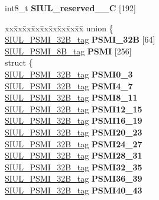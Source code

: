 \begin{DoxyCompactItemize}
\begin{tabbing}
\end{tabbing}\item 
\mbox{\label{structSIU__tag_a04fb21fe51eae5f1130c5e9516271325}} 
int8\+\_\+t {\bfseries S\+I\+U\+L\+\_\+reserved\+\_\+\_\+C} \mbox{[}192\mbox{]}
\item 
\mbox{\label{structSIU__tag_a2c80f10c0d6897747f3bd363f3743f54}} 
\begin{tabbing}
xx\=xx\=xx\=xx\=xx\=xx\=xx\=xx\=xx\=\kill
union \{\\
\>\mbox{\hyperlink{unionSIUL__PSMI__32B__tag}{SIUL\_PSMI\_32B\_tag}} {\bfseries PSMI\_32B} \mbox{[}64\mbox{]}\\
\>\mbox{\hyperlink{unionSIUL__PSMI__8B__tag}{SIUL\_PSMI\_8B\_tag}} {\bfseries PSMI} \mbox{[}256\mbox{]}\\
\mbox{\label{unionSIU__tag_1_1_0D1540_a0ab424fcfda3f1faddbe4e9bafea8845}} 
\>struct \{\\
\>\>\mbox{\hyperlink{unionSIUL__PSMI__32B__tag}{SIUL\_PSMI\_32B\_tag}} {\bfseries PSMI0\_3}\\
\>\>\mbox{\hyperlink{unionSIUL__PSMI__32B__tag}{SIUL\_PSMI\_32B\_tag}} {\bfseries PSMI4\_7}\\
\>\>\mbox{\hyperlink{unionSIUL__PSMI__32B__tag}{SIUL\_PSMI\_32B\_tag}} {\bfseries PSMI8\_11}\\
\>\>\mbox{\hyperlink{unionSIUL__PSMI__32B__tag}{SIUL\_PSMI\_32B\_tag}} {\bfseries PSMI12\_15}\\
\>\>\mbox{\hyperlink{unionSIUL__PSMI__32B__tag}{SIUL\_PSMI\_32B\_tag}} {\bfseries PSMI16\_19}\\
\>\>\mbox{\hyperlink{unionSIUL__PSMI__32B__tag}{SIUL\_PSMI\_32B\_tag}} {\bfseries PSMI20\_23}\\
\>\>\mbox{\hyperlink{unionSIUL__PSMI__32B__tag}{SIUL\_PSMI\_32B\_tag}} {\bfseries PSMI24\_27}\\
\>\>\mbox{\hyperlink{unionSIUL__PSMI__32B__tag}{SIUL\_PSMI\_32B\_tag}} {\bfseries PSMI28\_31}\\
\>\>\mbox{\hyperlink{unionSIUL__PSMI__32B__tag}{SIUL\_PSMI\_32B\_tag}} {\bfseries PSMI32\_35}\\
\>\>\mbox{\hyperlink{unionSIUL__PSMI__32B__tag}{SIUL\_PSMI\_32B\_tag}} {\bfseries PSMI36\_39}\\
\>\>\mbox{\hyperlink{unionSIUL__PSMI__32B__tag}{SIUL\_PSMI\_32B\_tag}} {\bfseries PSMI40\_43}\\

\end{tabbing}
\end{DoxyCompactItemize}
